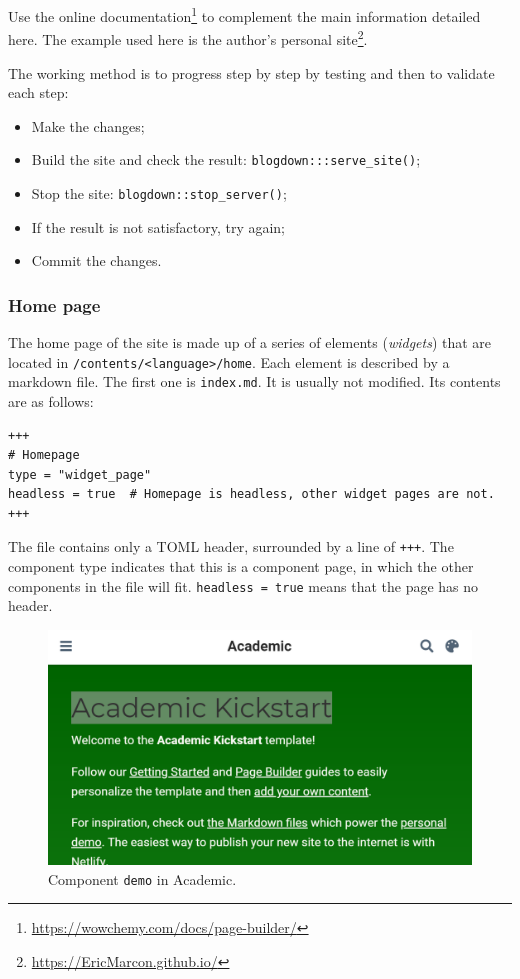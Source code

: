 \documentclass[
  12pt,
  american,
  a4paper,
  extrafontsizes,onecolumn,openright
  ]{memoir}
\providecommand{\tightlist}{%
  \setlength{\itemsep}{0pt}\setlength{\parskip}{0pt}}
\begin{document}
Use the online documentation\footnote{\url{https://wowchemy.com/docs/page-builder/}} to complement the main information detailed here.
The example used here is the author's personal site\footnote{\url{https://EricMarcon.github.io/}}.

The working method is to progress step by step by testing and then to validate each step:

\begin{itemize}
\tightlist
\item
  Make the changes;
\item
  Build the site and check the result: \texttt{blogdown:::serve\_site()};
\item
  Stop the site: \texttt{blogdown::stop\_server()};
\item
  If the result is not satisfactory, try again;
\item
  Commit the changes.
\end{itemize}

\hypertarget{home-page}{%
\subsubsection{Home page}\label{home-page}}

The home page of the site is made up of a series of elements (\emph{widgets}) that are located in \texttt{/contents/\textless{}language\textgreater{}/home}.
Each element is described by a markdown file.
The first one is \texttt{index.md}.
It is usually not modified.
Its contents are as follows:

\begin{verbatim}
+++
# Homepage
type = "widget_page"
headless = true  # Homepage is headless, other widget pages are not.
+++
\end{verbatim}

The file contains only a TOML header, surrounded by a line of \texttt{+++}.
The component type indicates that this is a component page, in which the other components in the file will fit.
\texttt{headless\ =\ true} means that the page has no header.



\scriptsize

\begin{figure}

{\centering \includegraphics[width=0.8\linewidth]{images/rediger-demo} 

}

\caption{Component \texttt{demo} in Academic.}\label{fig:rediger-demo}
\end{figure}
\end{document}
